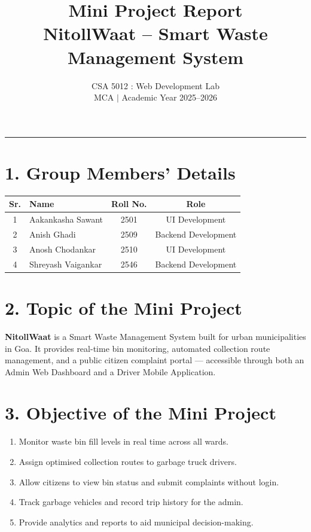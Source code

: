 \documentclass[12pt,a4paper]{article}
\title{\textbf{Mini Project Report}\\[0.3cm]
       \Large NitollWaat -- Smart Waste Management System}
\author{CSA 5012 : Web Development Lab \\ MCA $|$ Academic Year 2025--2026}
\date{}
\begin{document}
\maketitle
\hrule
\vspace{1cm}

\section*{1. Group Members' Details}

\begin{center}
\begin{tabular}{clcc}
\toprule
\textbf{Sr.} & \textbf{Name} & \textbf{Roll No.} & \textbf{Role} \\
\midrule
1 & Aakankasha Sawant  & 2501 & UI Development \\
2 & Anish Ghadi        & 2509 & Backend Development \\
3 & Anosh Chodankar    & 2510 & UI Development \\
4 & Shreyash Vaigankar & 2546 & Backend Development \\
\bottomrule
\end{tabular}
\end{center}

\section*{2. Topic of the Mini Project}

\textbf{NitollWaat} is a Smart Waste Management System built for urban
municipalities in Goa. It provides real-time bin monitoring, automated
collection route management, and a public citizen complaint portal ---
accessible through both an Admin Web Dashboard and a Driver Mobile
Application.

\clearpage
\section*{3. Objective of the Mini Project}

\begin{enumerate}[leftmargin=*, label=\arabic*.]
    \item Monitor waste bin fill levels in real time across all wards.
    \item Assign optimised collection routes to garbage truck drivers.
    \item Allow citizens to view bin status and submit complaints without login.
    \item Track garbage vehicles and record trip history for the admin.
    \item Provide analytics and reports to aid municipal decision-making.
\end{enumerate}
\end{document}
